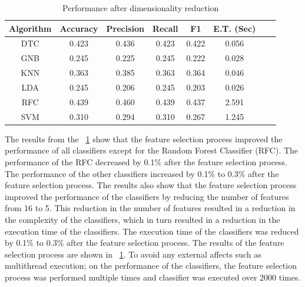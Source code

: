 \documentclass[conference,onecolumn]{IEEEtran}
\begin{document}
        \begin{table}[H]
            \centering
            \begin{tabular}{|c|c|c|c|c|c|c|c|}
                \hline
                    \textbf{Algorithm} &\textbf{Accuracy} &\textbf{Precision} &\textbf{Recall} &\textbf{F1} &\textbf{E.T. (Sec)} \\ \hline
                    \hline
                    DTC & 0.423   & 0.436   & 0.423  & 0.422  & 0.056 \\ \hline
                    GNB & 0.245   & 0.225   & 0.245  & 0.222  & 0.028 \\ \hline
                    KNN & 0.363   & 0.385   & 0.363  & 0.364  & 0.046 \\ \hline
                    LDA & 0.245   & 0.206   & 0.245  & 0.203  & 0.026 \\ \hline
                    RFC & 0.439   & 0.460   & 0.439  & 0.437  & 2.591 \\ \hline
                    SVM & 0.310   & 0.294   & 0.310  & 0.267  & 1.245 \\
                \hline
            \end{tabular}
            \caption{Performance after dimensionality reduction}
            \label{tab:performanceAfterDimensionalityReduction}
        \end{table}
        The results from the \tablename~\ref{tab:performanceAfterDimensionalityReduction} show that the feature selection process improved the performance of all classifiers except for the Random Forest Classifier (RFC). The performance of the RFC decreased by 0.1\% after the feature selection process. The performance of the other classifiers increased by 0.1\% to 0.3\% after the feature selection process. The results also show that the feature selection process improved the performance of the classifiers by reducing the number of features from 16 to 5. This reduction in the number of features resulted in a reduction in the complexity of the classifiers, which in turn resulted in a reduction in the execution time of the classifiers. The execution time of the classifiers was reduced by 0.1\% to 0.3\% after the feature selection process. The results of the feature selection process are shown in \tablename~\ref{tab:performanceAfterDimensionalityReduction}. To avoid any external affects such as multithread execution; on the performance of the classifiers, the feature selection process was performed multiple times and classifier was executed over 2000 times.
\end{document}
